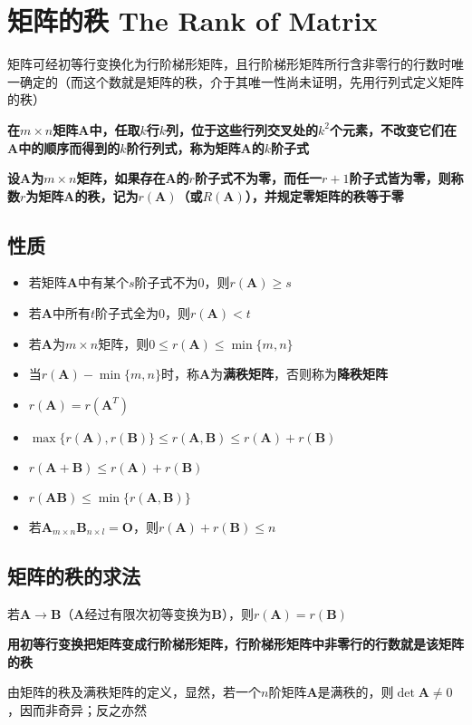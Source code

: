 \documentclass[UTF8]{ctexart}
\newcommand{\ve}[1]{{\bm{#1}}}
\newcommand{\mat}[1]{\ve{#1}}
\newcommand{\emplin}{\vspace{1em}}
\begin{document}
\section*{矩阵的秩 The Rank of Matrix}
矩阵可经初等行变换化为行阶梯形矩阵，且行阶梯形矩阵所行含非零行的行数时唯一确定的（而这个数就是矩阵的秩，介于其唯一性尚未证明，先用行列式定义矩阵的秩）

\emplin

\textbf{在$m\times n$矩阵$\mat{A}$中，任取$k$行$k$列，位于这些行列交叉处的$k^2$个元素，不改变它们在$\mat{A}$中的顺序而得到的$k$阶行列式，称为矩阵$\mat{A}$的$k$阶子式}

\emplin
\emplin

\textbf{设$\mat{A}$为$m\times n$矩阵，如果存在$\mat{A}$的$r$阶子式不为零，而任一$r+1$阶子式皆为零，则称数$r$为矩阵$\mat{A}$的秩，记为$r(\mat{A})$（或$R(\mat{A})$），并规定零矩阵的秩等于零}

\subsection*{性质}
\begin{itemize}
  \item 若矩阵$\mat{A}$中有某个$s$阶子式不为$0$，则$r(\mat{A})\ge s$
  \item 若$\mat{A}$中所有$t$阶子式全为$0$，则$r(\mat{A})<t$
  \item 若$\mat{A}$为$m\times n$矩阵，则$0\le r(\mat{A})\le \min\{ m,n \}$
  \item 当$r(\mat{A})-\min\{ m,n \}$时，称$\mat{A}$为\textbf{满秩矩阵}，否则称为\textbf{降秩矩阵}
  \item $r(\mat{A})=r(\mat{A}^T)$
  \item $\max\{ r(\mat{A}),r(\mat{B})\}\le r(\mat{A},\mat{B})\le r(\mat{A})+r(\mat{B})$
  \item $r(\mat{A}+\mat{B})\le r(\mat{A})+r(\mat{B})$
  \item $r(\mat{A}\mat{B})\le \min\{ r(\mat{A},\mat{B}) \}$
  \item 若$\mat{A}_{m\times n}\mat{B}_{n\times l}=\mat{O}$，则$r(\mat{A})+r(\mat{B})\le n$
\end{itemize}

\subsection*{矩阵的秩的求法}
若$\mat{A}\to\mat{B}$（$\mat{A}$经过有限次初等变换为$\mat{B}$），则$r(\mat{A})=r(\mat{B})$

\textbf{用初等行变换把矩阵变成行阶梯形矩阵，行阶梯形矩阵中非零行的行数就是该矩阵的秩}

由矩阵的秩及满秩矩阵的定义，显然，若一个$n$阶矩阵$\mat{A}$是满秩的，则$\det\mat{A}\ne0$，因而非奇异；反之亦然
\end{document}
